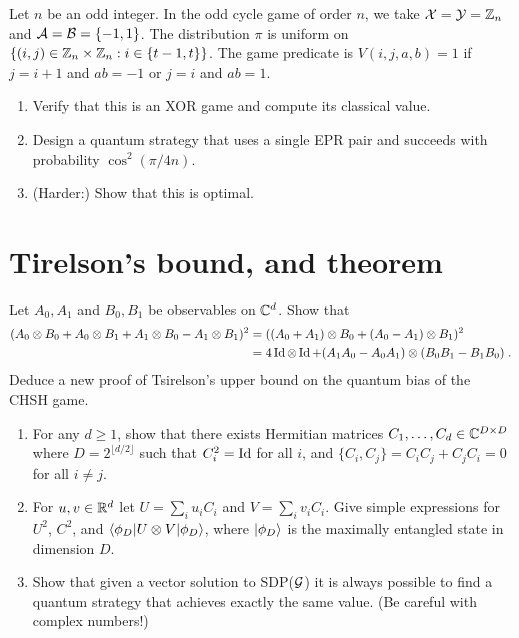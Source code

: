 \begin{exercise}
Let $n$ be an odd integer. In the odd cycle game of order $n$, we take $\mathcal{X}=\mathcal{Y}=\mathbb{Z}_n$ and $\mathcal{A}=\mathcal{B}=\{-1,1\}$. The distribution $\pi$ is uniform on $\{(i,j)\in \mathbb{Z}_n\times \mathbb{Z}_n : i\in\{t-1,t\}\}$. The game predicate is $V(i,j,a,b)=1$ if $j=i+1$ and $ab=-1$ or $j=i$ and $ab=1$. 
\begin{enumerate}
\item Verify that this is an XOR game and compute its classical value. 
\item Design a quantum strategy that uses a single EPR pair and succeeds with probability $\cos^2(\pi/4n)$. 
\item (Harder:) Show that this is optimal.
\end{enumerate}
\end{exercise}

\section{Tirelson's bound, and theorem}


\begin{exercise}
Let $A_0,A_1$ and $B_0,B_1$ be observables on $\mathbb{C}^d$. Show that
\begin{align}
(A_0\otimes B_0 + A_0\otimes B_1 + A_1\otimes B_0 - A_1\otimes B_1 )^2 &=( (A_0+A_1)\otimes B_0 + (A_0-A_1)\otimes B_1 )^2\label{eq:bellop}\\
&= 4\mathop{\rm Id}\nolimits\otimes \mathop{\rm Id}\nolimits + (A_1A_0-A_0A_1)\otimes (B_0B_1-B_1B_0)\;.\notag
\end{align}
Deduce a new proof of Tsirelson's upper bound on the quantum bias of the CHSH game. 
\end{exercise}

\begin{exercise}\label{ex:tsirelson}
\begin{enumerate}
\item For any $d\geq 1$, show that there exists Hermitian matrices $C_1,\ldots,C_d \in \mathbb{C}^{D\times D}$ where $D=2^{\lfloor d/2\rfloor}$ such that $C_i^2=\mathop{\rm Id}\nolimits$ for all $i$, and $\{C_i,C_j\}=C_iC_j+C_jC_i=0$ for all $i\neq j$.
\item For $u,v \in \mathbb{R}^d$ let $U = \sum_i u_i C_i$ and $V=\sum_i v_i C_i$. Give simple expressions for $U^2$, $C^2$, and $\langle\phi_D| U\otimes V |\phi_D\rangle$, where $|\phi_D\rangle$ is the maximally entangled state in dimension $D$.
\item Show that given a vector solution to SDP($\mathcal{G}$) it is always possible to find a quantum strategy that achieves exactly the same value. (Be careful with complex numbers!)
\end{enumerate}
\end{exercise}

